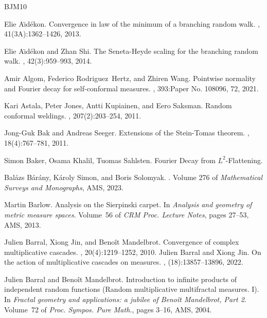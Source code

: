 \documentclass[12pt]{amsart}
\theoremstyle{definition}
\theoremstyle{remark}
\numberwithin{equation}{section}
\begin{document}
\begin{thebibliography}{BJM10}
	
	
	
	Elie A\"{\i}d\'{e}kon.
	\newblock Convergence in law of the minimum of a branching random walk.
	, 41(3A):1362--1426, 2013.
	
	Elie A\"{\i}d\'{e}kon and Zhan Shi.
	\newblock The {S}eneta-{H}eyde scaling for the branching random walk.
	, 42(3):959--993, 2014.
	
	
	Amir Algom, Federico Rodriguez~Hertz, and Zhiren Wang.
	\newblock Pointwise normality and {F}ourier decay for self-conformal measures.
	, 393:Paper No. 108096, 72, 2021.
	
	
	
Kari Astala, Peter Jones, Antti Kupiainen, and Eero Saksman.
\newblock Random conformal weldings.
, 207(2):203--254, 2011.	
	
	Jong-Guk Bak and Andreas Seeger.
	\newblock Extensions of the {S}tein-{T}omas theorem.
	, 18(4):767--781, 2011.
	
	Simon Baker, Osama Khalil, Tuomas Sahlsten. 
	\newblock Fourier Decay from $L^2$-Flattening. 
	
	
	Bal\'{a}zs B\'{a}r\'{a}ny, K\'{a}roly Simon, and Boris Solomyak.
	. Volume 276 of
	{\em Mathematical Surveys and Monographs},
	\newblock AMS, 2023.
	
	
	
	Martin Barlow.
	\newblock Analysis on the {S}ierpinski carpet.
	\newblock In {\em Analysis and geometry of metric measure spaces}. Volume~56 of
	{\em CRM Proc. Lecture Notes}, pages 27--53, AMS, 2013.
	
	Julien Barral, Xiong Jin, and Beno\^{i}t Mandelbrot.
	\newblock Convergence of complex multiplicative cascades.
	, 20(4):1219--1252, 2010.
	Julien Barral and Xiong Jin.
	\newblock On the action of multiplicative cascades on measures.
	, (18):13857--13896, 2022.
	
	Julien Barral and Beno\^{i}t Mandelbrot.
	\newblock Introduction to infinite products of independent random functions
	({R}andom multiplicative multifractal measures. {I}).
	\newblock In {\em Fractal geometry and applications: a jubilee of {B}eno\^{i}t
		{M}andelbrot, {P}art 2}. Volume~72 of {\em Proc. Sympos. Pure Math.}, pages
	3--16, AMS, 2004.
	

\end{thebibliography}
\end{document}
